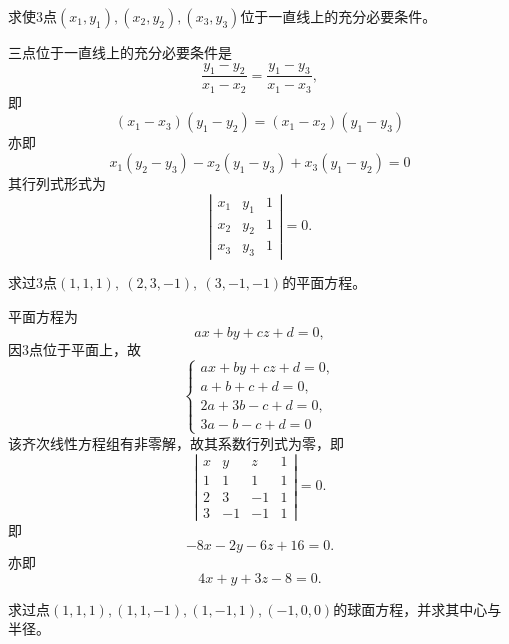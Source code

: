 \begin{li} 
  求使3点$(x_1,y_1), (x_2,y_2), (x_3,y_3)$位于一直线上的充分必要条件。
\end{li}
\begin{jie}
三点位于一直线上的充分必要条件是
$$
\frac{y_1-y_2}{x_1-x_2}=\frac{y_1-y_3}{x_1-x_3},
$$
即
$$
(x_1-x_3)(y_1-y_2)=(x_1-x_2)(y_1-y_3)
$$
亦即
$$
x_1(y_2-y_3)-x_2(y_1-y_3)+x_3(y_1-y_2)=0
$$
其行列式形式为
$$
\left|
\begin{array}{ccc}
x_1&y_1&1\\
x_2&y_2&1\\
x_3&y_3&1
\end{array}
\right|=0.
$$
\end{jie}






\begin{li} 
  求过3点$(1,1,1), ~(2,3,-1), ~(3,-1,-1)$的平面方程。
\end{li}

\begin{jie}
平面方程为
$$
ax+by+cz+d=0,
$$
因3点位于平面上，故
$$
\left\{
\begin{array}{r}
ax+by+cz+d=0,\\
a+b+c+d=0, \\
2a+3b-c+d=0, \\
3a-b-c+d=0
\end{array}
\right.
$$
该齐次线性方程组有非零解，故其系数行列式为零，即
$$
\left|
\begin{array}{rrrr}
x&y&z&1\\
1&1&1&1\\
2&3&-1&1\\
3&-1&-1&1
\end{array}
\right|=0.
$$
即
$$
-8 x - 2y -6z +16=0.
$$
亦即
$$
4x+y+3z-8=0.
$$
\end{jie}








\begin{li} 
  求过点$(1,1,1), (1,1,-1), (1,-1,1), (-1,0,0)$的球面方程，并求其中心与半径。
\end{li}

